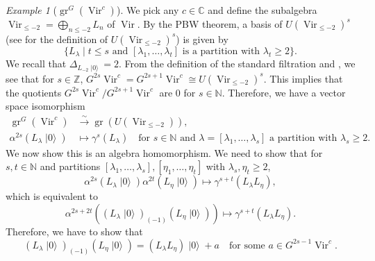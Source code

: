\documentclass[a4paper, 12pt, reqno]{amsart}
\theoremstyle{remark}
\newtheorem{example}[theorem]{Example}
\numberwithin{equation}{subsection}
\DeclareMathOperator{\Vir}{Vir}
\DeclareMathOperator{\gr}{gr}
\DeclareMathOperator{\vac}{|0\rangle}
\begin{document}
\begin{example}[$\gr^G(\Vir^c)$]
  \label{exa:13}
  We pick any $c \in \mathbb{C}$ and define the subalgebra $\Vir_{\le -2} = \bigoplus_{n \le -2}L_{n}$ of $\Vir$.
  By the PBW theorem, a basis of $U(\Vir_{\le -2})^s$ (see  for the definition of $U(\Vir_{\le -2})^s$) is given by
  \begin{equation*}
    \{L_{\lambda} \mid t \le s\text{ and }[\lambda_1, \dots, \lambda_t]\text{ is a partition with }\lambda_t \ge 2\}.
  \end{equation*}
  We recall that $\Delta_{L_{-2}\vac} = 2$.
  From the definition of the standard filtration and , we see that for $s \in \mathbb{Z}$, $G^{2s}\Vir^c = G^{2s + 1}\Vir^c \cong U(\Vir_{\le -2})^s$.
  This implies that the quotients $G^{2s}\Vir^c/G^{2s + 1}\Vir^c$ are $0$ for $s \in \mathbb{N}$.
  Therefore, we have a vector space isomorphism
  \begin{align*}
    \gr^G(\Vir^c) &\xrightarrow{\sim} \gr(U(\Vir_{\le -2})), \\
    \alpha^{2s}(L_{\lambda}\vac) &\mapsto \gamma^s(L_{\lambda}) \quad \text{for }s \in \mathbb{N}\text{ and }\lambda = [\lambda_1, \dots, \lambda_s]\text{ a partition with }\lambda_s \ge 2.
  \end{align*}
  We now show this is an algebra homomorphism.
  We need to show that for $s, t \in \mathbb{N}$ and partitions $[\lambda_1, \dots, \lambda_s], [\eta_1, \dots, \eta_t]$ with $\lambda_s, \eta_t \ge 2$,
  \begin{equation*}
    \alpha^{2s}(L_{\lambda}\vac)\alpha^{2t}(L_{\eta}\vac) \mapsto \gamma^{s + t}(L_{\lambda}L_{\eta}),
  \end{equation*}
  which is equivalent to
  \begin{equation*}
    \alpha^{2s + 2t}((L_{\lambda}\vac)_{(-1)}(L_{\eta}\vac)) \mapsto \gamma^{s + t}(L_{\lambda}L_{\eta}).
  \end{equation*}
  Therefore, we have to show that
  \begin{equation}
    \label{eq:36}
    (L_{\lambda}\vac)_{(-1)}(L_{\eta}\vac) = (L_{\lambda}L_{\eta})\vac + a \quad \text{for some }a \in G^{2s - 1}\Vir^c.
  \end{equation}


\end{example}
\end{document}
